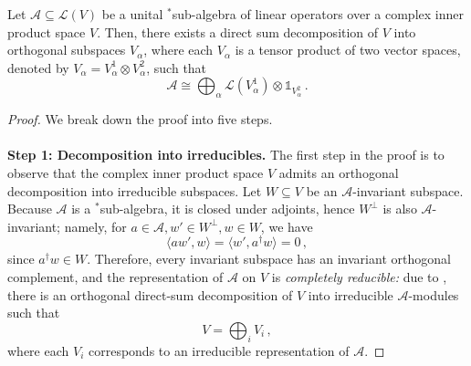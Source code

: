 \begin{lemma}
    Let $\mathcal{A} \subseteq \mathcal{L}(V)$ be a unital $^*$sub-algebra of linear operators over a complex inner product space $V$. Then, there exists a direct sum decomposition of $V$ into orthogonal subspaces $V_\alpha$, where each $V_\alpha$ is a tensor product of two vector spaces, denoted by $V_\alpha = V^1_\alpha \otimes V^2_\alpha$, such that
    \[ \mathcal{A} \cong \bigoplus_{\alpha} \mathcal{L}(V^1_\alpha) \otimes \mathbb{1}_{V^2_\alpha} \, . \]
\end{lemma}
\begin{proof} We break down the proof into five steps.\ \\
\ \\
\textbf{Step 1: Decomposition into irreducibles.} The first step in the proof is to observe that the complex inner product space $V$ admits an orthogonal decomposition into irreducible subspaces.
Let $W \subseteq V$ be an $\mathcal{A}$-invariant subspace. Because $\mathcal{A}$ is a $^*$sub-algebra, it is closed under adjoints, hence $W^\perp$ is also $\mathcal{A}$-invariant; namely, for $a \in \mathcal{A},w' \in W^\perp, w \in W$, we have
$$
\langle a w', w\rangle = \langle w',a^\dag w\rangle = 0 \, ,
$$
since $a^\dag w \in W$. Therefore, every invariant subspace has an invariant orthogonal complement, and the representation of $\mathcal{A}$ on $V$ is \emph{completely reducible:} due to , there is an orthogonal direct-sum decomposition of $V$ into irreducible $\mathcal{A}$-modules such that
$$
V = \bigoplus_i V_i \, ,
$$
where each $V_i$ corresponds to an irreducible representation of $\mathcal{A}$.


\end{proof}

